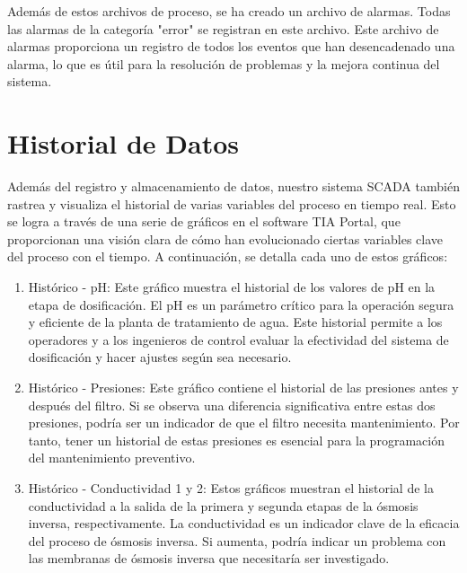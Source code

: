 Además de estos archivos de proceso, se ha creado un archivo de alarmas. Todas las alarmas de la categoría "error" se registran en este archivo. Este archivo de alarmas proporciona un registro de todos los eventos que han desencadenado una alarma, lo que es útil para la resolución de problemas y la mejora continua del sistema.\\




\section{Historial de Datos}

Además del registro y almacenamiento de datos, nuestro sistema SCADA también rastrea y visualiza el historial de varias variables del proceso en tiempo real. Esto se logra a través de una serie de gráficos en el software TIA Portal, que proporcionan una visión clara de cómo han evolucionado ciertas variables clave del proceso con el tiempo. A continuación, se detalla cada uno de estos gráficos:\\

\begin{enumerate}
    \item Histórico - pH: Este gráfico muestra el historial de los valores de pH en la etapa de dosificación. El pH es un parámetro crítico para la operación segura y eficiente de la planta de tratamiento de agua. Este historial permite a los operadores y a los ingenieros de control evaluar la efectividad del sistema de dosificación y hacer ajustes según sea necesario.
   \item Histórico - Presiones: Este gráfico contiene el historial de las presiones antes y después del filtro. Si se observa una diferencia significativa entre estas dos presiones, podría ser un indicador de que el filtro necesita mantenimiento. Por tanto, tener un historial de estas presiones es esencial para la programación del mantenimiento preventivo.
   \item Histórico - Conductividad 1 y 2: Estos gráficos muestran el historial de la conductividad a la salida de la primera y segunda etapas de la ósmosis inversa, respectivamente. La conductividad es un indicador clave de la eficacia del proceso de ósmosis inversa. Si aumenta, podría indicar un problema con las membranas de ósmosis inversa que necesitaría ser investigado.

\end{enumerate}



